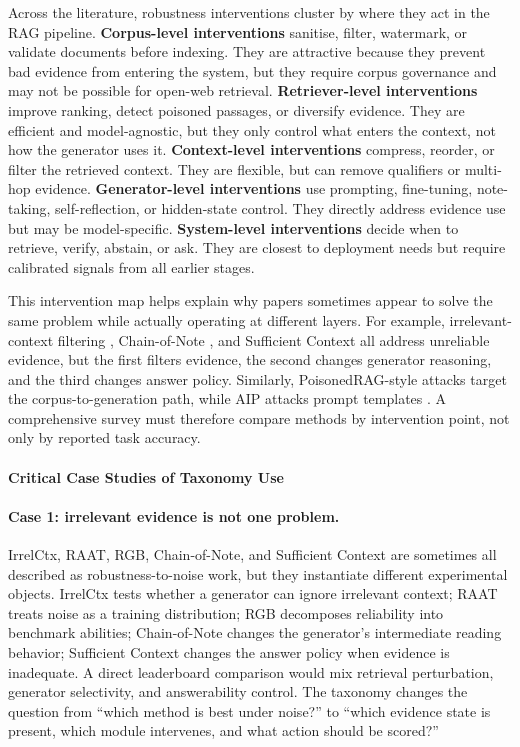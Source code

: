 Across the literature, robustness interventions cluster by where they act in the RAG pipeline. \textbf{Corpus-level interventions} sanitise, filter, watermark, or validate documents before indexing. They are attractive because they prevent bad evidence from entering the system, but they require corpus governance and may not be possible for open-web retrieval. \textbf{Retriever-level interventions} improve ranking, detect poisoned passages, or diversify evidence. They are efficient and model-agnostic, but they only control what enters the context, not how the generator uses it. \textbf{Context-level interventions} compress, reorder, or filter the retrieved context. They are flexible, but can remove qualifiers or multi-hop evidence. \textbf{Generator-level interventions} use prompting, fine-tuning, note-taking, self-reflection, or hidden-state control. They directly address evidence use but may be model-specific. \textbf{System-level interventions} decide when to retrieve, verify, abstain, or ask. They are closest to deployment needs but require calibrated signals from all earlier stages.

This intervention map helps explain why papers sometimes appear to solve the same problem while actually operating at different layers. For example, irrelevant-context filtering \citep{irrelevantContext2023}, Chain-of-Note \citep{chainOfNote2023}, and Sufficient Context \citep{sufficientContext2024} all address unreliable evidence, but the first filters evidence, the second changes generator reasoning, and the third changes answer policy. Similarly, PoisonedRAG-style attacks \citep{poisonedRAG2024} target the corpus-to-generation path, while AIP attacks prompt templates \citep{aip2025}. A comprehensive survey must therefore compare methods by intervention point, not only by reported task accuracy.

\paragraph{Critical Case Studies of Taxonomy Use}


\paragraph{Case 1: irrelevant evidence is not one problem.}
IrrelCtx, RAAT, RGB, Chain-of-Note, and Sufficient Context are sometimes all described as robustness-to-noise work, but they instantiate different experimental objects. IrrelCtx tests whether a generator can ignore irrelevant context; RAAT treats noise as a training distribution; RGB decomposes reliability into benchmark abilities; Chain-of-Note changes the generator's intermediate reading behavior; Sufficient Context changes the answer policy when evidence is inadequate. A direct leaderboard comparison would mix retrieval perturbation, generator selectivity, and answerability control. The taxonomy changes the question from ``which method is best under noise?'' to ``which evidence state is present, which module intervenes, and what action should be scored?''

